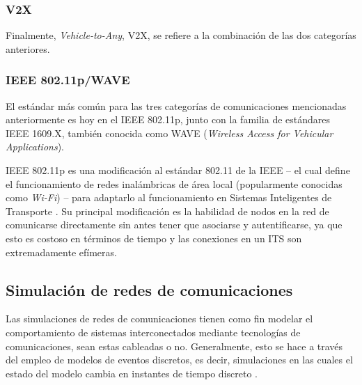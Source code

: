 \subsubsection{V2X}

Finalmente, \emph{Vehicle-to-Any}, V2X, se refiere a la combinación de las dos categorías anteriores.

\subsubsection{IEEE 802.11p/WAVE}\label{sec:its_comms:wave}

El estándar más común para las tres categorías de comunicaciones mencionadas anteriormente es hoy en el IEEE 802.11p, junto con la familia de estándares IEEE 1609.X, también conocida como WAVE (\emph{Wireless Access for Vehicular Applications}).

IEEE 802.11p es una modificación al estándar 802.11 de la IEEE -- el cual define el funcionamiento de redes inalámbricas de área local (popularmente conocidas como \emph{Wi-Fi}) -- para adaptarlo al funcionamiento en Sistemas Inteligentes de Transporte \autocite{80211wave}. Su principal modificación es la habilidad de nodos en la red de comunicarse directamente sin antes tener que asociarse y autentificarse, ya que esto es costoso en términos de tiempo y las conexiones en un ITS son extremadamente efímeras.


%

\subsection{Simulación de redes de comunicaciones}

Las simulaciones de redes de comunicaciones tienen como fin modelar el comportamiento de sistemas interconectados mediante tecnologías de comunicaciones, sean estas cableadas o no. Generalmente, esto se hace a través del empleo de modelos de eventos discretos, es decir, simulaciones en las cuales el estado del modelo cambia en instantes de tiempo discreto \autocite{SchriberDiscreteSim}.

